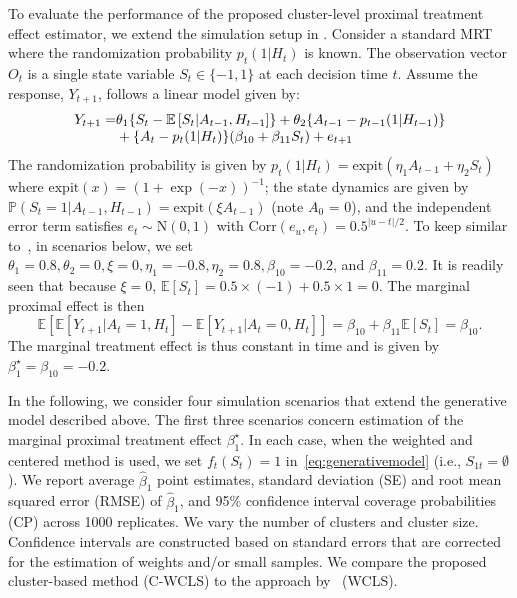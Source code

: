 \documentclass[12pt]{article}
\def\E{\mathbb{E}}
\newcommand{\zw}[1]{\textcolor{blue}{[\textit{ZW: #1}]}}
\begin{document}
To evaluate the performance of the proposed cluster-level proximal treatment effect estimator, we extend the simulation setup in \cite{Boruvkaetal}. Consider a standard MRT where the randomization probability $p_t(1|H_t)$ is known. The observation vector $O_t$ is a single state variable $S_t \in \{-1,1\}$ at each decision time $t$. Assume the response, $Y_{t+1}$, follows a linear model given by:
\begin{equation}
\label{eq:generativemodel}
\begin{array}{r@{}l}
    Y_{t+1} = &{} \theta_1 \{S_t - \E \left[ S_t|A_{t-1},H_{t-1}\right]\} + \theta_2\{A_{t-1}-p_{t-1}(1|H_{t-1})\} \\
    &{}+ \{A_t - p_t(1|H_t)\}(\beta_{10} + \beta_{11} S_t)+  e_{t+1}
\end{array}
\end{equation}
The randomization probability is given by $p_t(1|H_t) = \text{expit}(\eta_1 A_{t-1}+\eta_2 S_t)$ where $\text{expit}(x)=(1+\exp(-x))^{-1}$; the state dynamics are given by $\mathbb{P}(S_t=1|A_{t-1},H_{t-1})=\text{expit}(\xi A_{t-1})$ (note $A_0$ = 0), and the independent error term satisfies $e_t \sim \text{N}(0,1)$ with $\text{Corr}(e_u, e_t) = 0.5^{|u-t|/2}$. To keep similar to~\cite{Boruvkaetal}, in scenarios below, we set $\theta_1=0.8, \theta_2 = 0, \xi=0, \eta_1 = -0.8, \eta_2 = 0.8, \beta_{10}=-0.2$, and $\beta_{11} = 0.2$. It is readily seen that because $\xi=0$, $\E \left[S_t \right]=0.5\times (-1) +0.5\times 1=0$. The marginal proximal effect is then
$$
\E \left[ \E \left[Y_{t+1}|A_{t}=1,H_t \right] - \E \left[Y_{t+1}|A_t=0,H_t \right] \right] = \beta_{10} + \beta_{11} \E \left[S_t \right]=\beta_{10}.
$$
The marginal treatment effect is thus constant in time and is given by $\beta_1^\star = \beta_{10} =  -0.2$.

In the following, we consider four simulation scenarios that extend the generative model described above. The first three scenarios concern estimation of the marginal proximal treatment effect $\beta_1^\star$. In each case, when the weighted and centered method is used, we set $f_t(S_t)=1$ in~\eqref{eq:generativemodel} (i.e., $S_{1t} = \emptyset$). We report average $\hat{\beta}_1$ point estimates, standard deviation (SE) and root mean squared error (RMSE) of $\hat{\beta}_1$, and 95\% confidence interval coverage probabilities (CP) across 1000 replicates. We vary the number of clusters and cluster size.  Confidence intervals are constructed based on standard errors that are corrected for the estimation of weights and/or small samples.  We compare the proposed cluster-based method (C-WCLS) to the approach by~\cite{Boruvkaetal} (WCLS).
\end{document}
